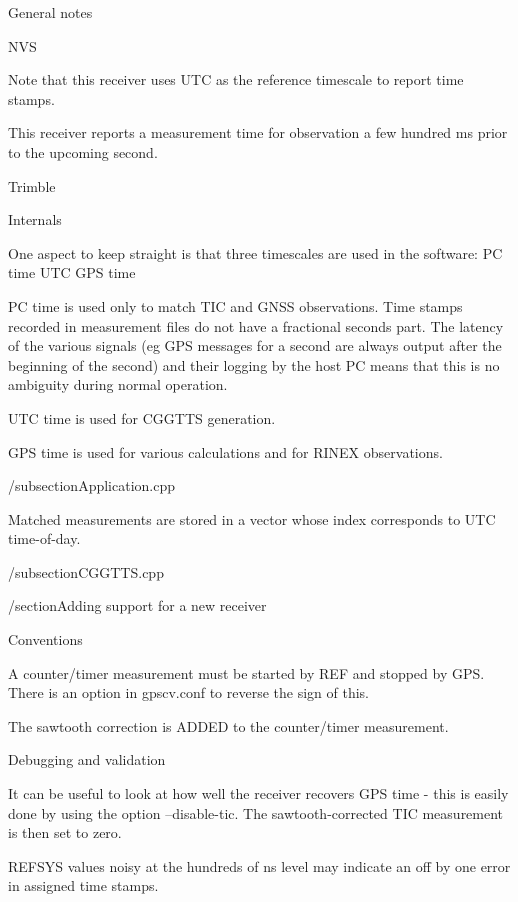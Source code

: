 
General notes

NVS

Note that this receiver uses UTC as the reference timescale to report time stamps.

This receiver reports a measurement time for observation a few hundred ms prior to the upcoming
second.

Trimble

 

Internals

One aspect to keep straight is that three timescales are used in the software:
PC time
UTC
GPS time

PC time is used only to match TIC and GNSS observations. Time stamps recorded in measurement files do
not have a fractional seconds part. The latency of the various signals (eg GPS messages 
for a second are always output after the beginning of the second) and their logging by the host PC 
means that this is no ambiguity during normal operation.

UTC time is used for CGGTTS generation.

GPS time is used for various calculations and for RINEX observations.

/subsection{Application.cpp}

Matched measurements are stored in a vector whose index corresponds to UTC time-of-day.

/subsection{CGGTTS.cpp}



/section{Adding support for a new receiver}

Conventions

A counter/timer measurement must be started by REF and stopped by GPS.
There is an option in gpscv.conf to reverse the sign of this.

The sawtooth correction is ADDED to the counter/timer measurement.


Debugging and validation

It can be useful to look at how well the receiver recovers GPS time - this is easily done by
using the option --disable-tic. The sawtooth-corrected TIC measurement is then set to zero.

REFSYS values noisy at the hundreds of ns level may indicate an off by one error in assigned time stamps.